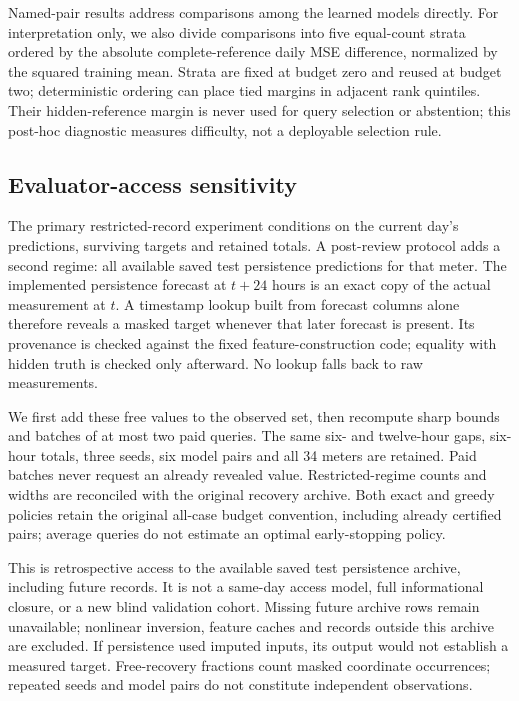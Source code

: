 \documentclass[12pt]{article}
\begin{document}
Named-pair results address comparisons among the learned models directly.
For interpretation only, we also divide comparisons into five equal-count
strata ordered by the absolute complete-reference daily MSE difference,
normalized by the squared training mean. Strata are fixed at budget zero
and reused at budget two; deterministic ordering can place tied margins
in adjacent rank quintiles. Their hidden-reference margin is never used for
query selection or abstention; this post-hoc diagnostic measures difficulty,
not a deployable selection rule.



\subsection{Evaluator-access sensitivity}\label{app:access-design}
The primary restricted-record experiment conditions on the current day's
predictions, surviving targets and retained totals. A post-review protocol
adds a second regime: all available saved test persistence predictions
for that meter. The implemented persistence forecast at $t+24$ hours is
an exact copy of the actual measurement at $t$. A timestamp lookup built
from forecast columns alone therefore reveals a masked target whenever
that later forecast is present. Its provenance is checked against the
fixed feature-construction code; equality with hidden truth is checked
only afterward. No lookup falls back to raw measurements.

We first add these free values to the observed set, then recompute sharp
bounds and batches of at most two paid queries. The same six- and
twelve-hour gaps, six-hour totals, three seeds, six model pairs and all
34 meters are retained. Paid batches never request an already revealed
value. Restricted-regime counts and widths are reconciled with the original
recovery archive. Both exact and greedy policies retain the original
all-case budget convention, including already certified pairs; average
queries do not estimate an optimal early-stopping policy.

This is retrospective access to the available saved test persistence
archive, including future records. It is not a same-day access model,
full informational closure, or a new blind validation cohort. Missing
future archive rows remain unavailable; nonlinear inversion, feature
caches and records outside this archive are excluded. If persistence
used imputed inputs, its output would not establish a measured target.
Free-recovery fractions count masked coordinate occurrences; repeated
seeds and model pairs do not constitute independent observations.
\end{document}
